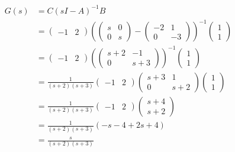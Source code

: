 \documentclass[12pt]{article}
\begin{document}
\begin{align*}
  G(s) &= C(sI-A)^{-1}B \\
  &=
    \begin{pmatrix}
      -1 & 2
    \end{pmatrix}
           \left(
           \begin{pmatrix}
             s & 0 \\
             0 & s
           \end{pmatrix} -
                 \begin{pmatrix}
                   -2 & 1 \\
                   0 & -3
                 \end{pmatrix}
           \right)^{-1}
                       \begin{pmatrix}
                         1 \\
                         1
                       \end{pmatrix} \\
  &= \begin{pmatrix}
      -1 & 2
    \end{pmatrix}
           \left(
           \begin{pmatrix}
             s+2 & -1 \\
             0 & s+3
           \end{pmatrix}\right)^{-1}
                       \begin{pmatrix}
                         1 \\
                         1
                       \end{pmatrix} \\
  &= \frac{1}{(s+2)(s+3)}
    \begin{pmatrix}
      -1 & 2
    \end{pmatrix}
           \begin{pmatrix}
             s + 3 & 1 \\
             0 & s+2
           \end{pmatrix}
                 \begin{pmatrix}
                   1 \\
                   1
                 \end{pmatrix} \\
  &= \frac{1}{(s+2)(s+3)}
    \begin{pmatrix}
      -1 & 2
    \end{pmatrix}
           \begin{pmatrix}
             s + 4 \\
             s + 2
           \end{pmatrix} \\
  &= \frac{1}{(s+2)(s+3)}(-s-4+2s+4) \\
  &= \frac{s}{(s+2)(s+3)}
\end{align*}
\end{document}
